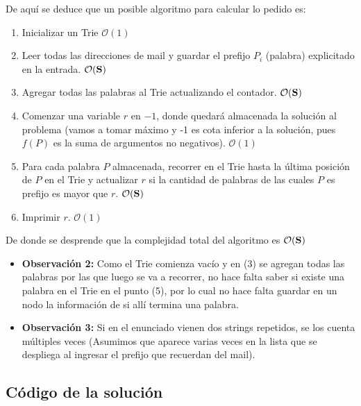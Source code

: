 	De aquí se deduce que un posible algoritmo para calcular lo pedido es:
	
\begin{enumerate}
	\item Inicializar un Trie $\mathcal{O}(1)$
	\item Leer todas las direcciones de mail y guardar el prefijo $P_i$ (palabra) explicitado en la entrada. $\mathcal{O}(\bf S)$ 
	\item Agregar todas las palabras al Trie actualizando el contador. $\mathcal{O}(\bf S)$ 
	\item Comenzar una variable $r$ en $-1$, donde quedará almacenada la solución al problema (vamos a tomar máximo y -1 es cota inferior a la solución, pues $f(P)$ es la suma de argumentos no negativos). $\mathcal{O}(1)$
	\item Para cada palabra $P$ almacenada, recorrer en el Trie hasta la última posición de $P$ en el Trie y actualizar $r$ si la cantidad de palabras de las cuales $P$ es prefijo es mayor que $r$. $\mathcal{O}(\bf S)$
	\item Imprimir $r$. $\mathcal{O}(1)$
\end{enumerate}

De donde se desprende que la complejidad total del algoritmo es $\mathcal{O}(\bf S)$

\begin{itemize}
	\item \textbf{Observación 2:} Como el Trie comienza vacío y en (3) se agregan todas las palabras por las que luego se va a recorrer, no hace falta saber si existe una palabra en el Trie en el punto (5), por lo cual no hace falta guardar en un nodo la información de si allí termina una palabra.
	\item \textbf{Observación 3:} Si en el enunciado vienen dos strings repetidos, se los cuenta múltiples veces (Asumimos que aparece varias veces en la lista que se despliega al ingresar el prefijo que recuerdan del mail).  
\end{itemize}

\newpage
\subsection{Código de la solución}
\lstset{inputencoding=utf8/latin1}


